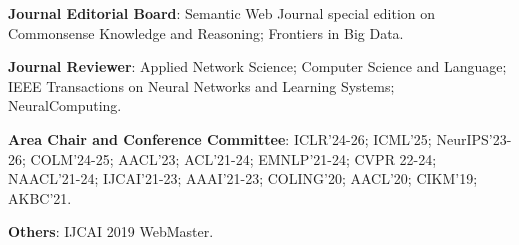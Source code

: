 

\begin{cventries}

\begin{cvitems}
    \item {\textbf{Journal Editorial Board}: Semantic Web Journal special edition on Commonsense Knowledge and Reasoning; Frontiers in Big Data.}
    \item {\textbf{Journal Reviewer}: Applied Network Science; Computer Science and Language; IEEE Transactions on Neural Networks and Learning Systems; NeuralComputing.}
    \item {\textbf{Area Chair and Conference Committee}: ICLR'24-26; ICML'25; NeurIPS'23-26; COLM'24-25; AACL'23; ACL'21-24; EMNLP'21-24; CVPR 22-24; NAACL'21-24; IJCAI'21-23; AAAI'21-23; COLING'20; AACL'20; CIKM'19; AKBC'21.}
    \item {\textbf{Others}: IJCAI 2019 WebMaster.}
\end{cvitems}
    



\end{cventries}
